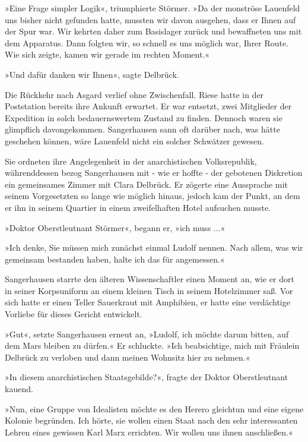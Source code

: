 »Eine Frage simpler Logik«, triumphierte Störmer. »Da der monströse
Lauenfeld uns bisher nicht gefunden hatte, mussten wir davon
ausgehen, dass er Ihnen auf der Spur war. Wir kehrten daher zum
Basislager zurück und bewaffneten uns mit dem Apparatus. Dann
folgten wir, so schnell es uns möglich war, Ihrer Route. Wie sich
zeigte, kamen wir gerade im rechten Moment.«

»Und dafür danken wir Ihnen«, sagte Delbrück.

\bigpar

Die Rückkehr nach Asgard verlief ohne Zwischenfall. Riese hatte in
der Poststation bereits ihre Ankunft erwartet. Er war entsetzt,
zwei Mitglieder der Expedition in solch bedauernswertem Zustand zu
finden. Dennoch waren sie glimpflich davongekommen. Sangerhausen
sann oft darüber nach, was hätte geschehen können, wäre Lauenfeld
nicht ein solcher Schwätzer gewesen.

Sie ordneten ihre Angelegenheit in der anarchistischen
Volksrepublik, währenddessen bezog Sangerhausen mit - wie er
hoffte - der gebotenen Diskretion ein gemeinsames Zimmer mit Clara
Delbrück. Er zögerte eine Aussprache mit seinem Vorgesetzten so
lange wie möglich hinaus, jedoch kam der Punkt, an dem er ihn in
seinem Quartier in einem zweifelhaften Hotel aufsuchen musste.

»Doktor Oberstleutnant Störmer«, begann er, »ich muss ...«

»Ich denke, Sie müssen mich zunächst einmal Ludolf nennen. Nach
allem, was wir gemeinsam bestanden haben, halte ich das für
angemessen.«

Sangerhausen starrte den älteren Wissenschaftler einen Moment an,
wie er dort in seiner Korpsuniform an einem kleinen Tisch in seinem
Hotelzimmer saß. Vor sich hatte er einen Teller Sauerkraut mit
Amphibien, er hatte eine verdächtige Vorliebe für dieses Gericht
entwickelt.

»Gut«, setzte Sangerhausen erneut an, »Ludolf, ich möchte darum
bitten, auf dem Mars bleiben zu dürfen.« Er schluckte. »Ich
beabsichtige, mich mit Fräulein Delbrück zu verloben und dann
meinen Wohnsitz hier zu nehmen.«

»In diesem anarchistischen Staatsgebilde?«, fragte der Doktor
Oberstleutnant kauend.

»Nun, eine Gruppe von Idealisten möchte es den Herero gleichtun und
eine eigene Kolonie begründen. Ich hörte, sie wollen einen Staat
nach den sehr interessanten Lehren eines gewissen Karl Marx
errichten. Wir wollen uns ihnen anschließen.«


